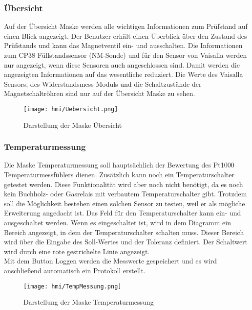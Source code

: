 \newpage
\subsubsection{Übersicht}
Auf der Übersicht Maske werden alle wichtigen Informationen zum Prüfstand auf einen Blick angezeigt. Der Benutzer erhält einen Überblick über den Zustand des Prüfstands und kann das Magnetventil ein- und ausschalten. Die Informationen zum CP38 Füllstandssensor (NM-Sonde) und für den Sensor von Vaisalla werden nur angezeigt, wenn diese Sensoren auch angeschlossen sind. Damit werden die angezeigten Informationen auf das wesentliche reduziert. Die Werte des Vaisalla Sensors, des Widerstandsmess-Moduls und die Schaltzustände der Magnetschaltröhren sind nur auf der Übersicht Maske zu sehen.
\vspace*{\fill}
\begin{figure}[h]
\centering
\texttt{[image: hmi/Uebersicht.png]}
\caption{Darstellung der Maske Übersicht}
\label{abbildung_uebersicht}
\end{figure}
\vspace*{4cm}

\newpage
\subsubsection{Temperaturmessung}
Die Maske Temperaturmessung soll hauptsächlich der Bewertung des Pt1000 Temperaturmessfühlers dienen. Zusätzlich kann noch ein Temperaturschalter getestet werden. Diese Funktionalität wird aber noch nicht benötigt, da es noch kein Buchholz- oder Gasrelais mit verbautem Temperaturschalter gibt. Trotzdem soll die Möglichkeit bestehen einen solchen Sensor zu testen, weil er als mögliche Erweiterung angedacht ist. Das Feld für den Temperaturschalter kann ein- und ausgeschaltet werden. Wenn es eingeschaltet ist, wird in dem Diagramm ein Bereich angezeigt, in dem der Temperaturschalter schalten muss. Dieser Bereich wird über die Eingabe des Soll-Wertes und der Toleranz definiert. Der Schaltwert wird durch eine rote gestrichelte Linie angezeigt.
\\
Mit dem Button Loggen werden die Messwerte gespeichert und es wird anschließend automatisch ein Protokoll erstellt.
\vspace*{\fill}
\begin{figure}[h]
\centering
\texttt{[image: hmi/TempMessung.png]}
\caption{Darstellung der Maske Temperaturmessung}
\label{abbildung_temperaturmessung}
\end{figure}
\vspace*{4cm}

